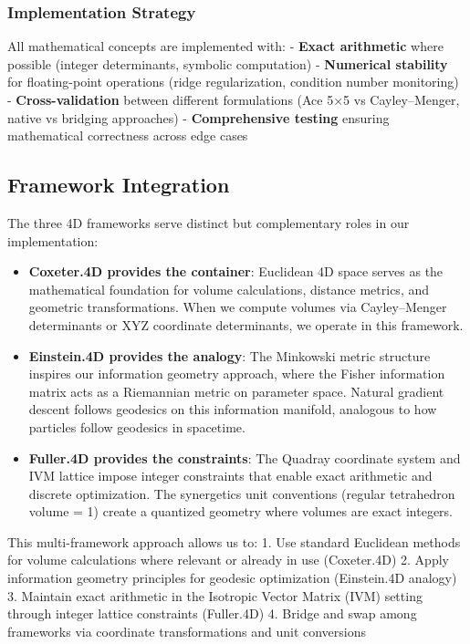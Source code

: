 \documentclass[
  10pt,
]{article}
\begin{document}
\hypertarget{implementation-strategy}{%
\subsubsection{Implementation Strategy}\label{implementation-strategy}}

All mathematical concepts are implemented with: - \textbf{Exact
arithmetic} where possible (integer determinants, symbolic computation)
- \textbf{Numerical stability} for floating-point operations (ridge
regularization, condition number monitoring) - \textbf{Cross-validation}
between different formulations (Ace 5×5 vs Cayley--Menger, native vs
bridging approaches) - \textbf{Comprehensive testing} ensuring
mathematical correctness across edge cases

\hypertarget{framework-integration}{%
\subsection{Framework Integration}\label{framework-integration}}

The three 4D frameworks serve distinct but complementary roles in our
implementation:

\begin{itemize}
\item
  \textbf{Coxeter.4D provides the container}: Euclidean 4D space serves
  as the mathematical foundation for volume calculations, distance
  metrics, and geometric transformations. When we compute volumes via
  Cayley--Menger determinants or XYZ coordinate determinants, we operate
  in this framework.
\item
  \textbf{Einstein.4D provides the analogy}: The Minkowski metric
  structure inspires our information geometry approach, where the Fisher
  information matrix acts as a Riemannian metric on parameter space.
  Natural gradient descent follows geodesics on this information
  manifold, analogous to how particles follow geodesics in spacetime.
\item
  \textbf{Fuller.4D provides the constraints}: The Quadray coordinate
  system and IVM lattice impose integer constraints that enable exact
  arithmetic and discrete optimization. The synergetics unit conventions
  (regular tetrahedron volume = 1) create a quantized geometry where
  volumes are exact integers.
\end{itemize}

This multi-framework approach allows us to: 1. Use standard Euclidean
methods for volume calculations where relevant or already in use
(Coxeter.4D) 2. Apply information geometry principles for geodesic
optimization (Einstein.4D analogy)\\
3. Maintain exact arithmetic in the Isotropic Vector Matrix (IVM)
setting through integer lattice constraints (Fuller.4D) 4. Bridge and
swap among frameworks via coordinate transformations and unit
conversions
\end{document}
